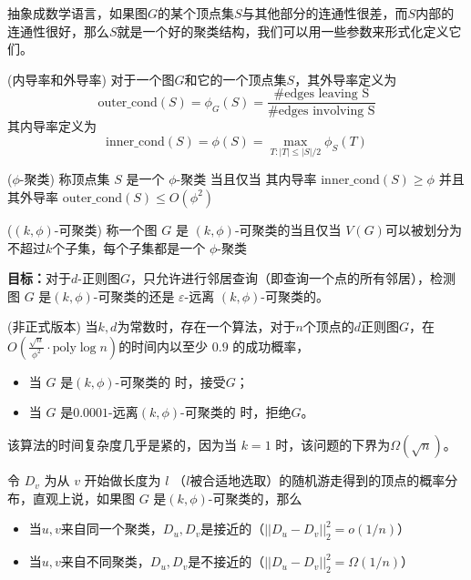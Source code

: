 抽象成数学语言，如果图$G$的某个顶点集$S$与其他部分的连通性很差，而$S$内部的连通性很好，那么$S$就是一个好的聚类结构，我们可以用一些参数来形式化定义它们。

\begin{definition}{(内导率和外导率)}
    对于一个图$G$和它的一个顶点集$S$，其外导率定义为
    \[
    \mathrm{outer\_cond}(S)=\phi_G(S)=\frac{\# \text{edges leaving S}}{\# \text{edges involving S}}
    \]
    其内导率定义为
    \[
    \mathrm{inner\_cond}(S)=\phi(S)=\max_{T:|T|\leq |S|/2} \phi_S(T)
    \]
\end{definition}

\begin{definition}{($\phi$-聚类)}
    称顶点集 $S$ 是一个 $\phi$-聚类 当且仅当 其内导率 $\mathrm{inner\_cond}(S)\geq \phi$ 并且 其外导率 $\mathrm{outer\_cond}(S)\leq O(\phi^2)$
\end{definition}

\begin{definition}{($(k,\phi)$-可聚类)}
    称一个图 $G$ 是 $(k,\phi)$-可聚类的当且仅当 $V(G)$可以被划分为不超过$k$个子集，每个子集都是一个 $\phi$-聚类
\end{definition}

\textbf{目标：}对于$d$-正则图$G$，只允许进行邻居查询（即查询一个点的所有邻居），检测图 $G$ 是$(k,\phi)$-可聚类的还是 $\varepsilon$-远离 $(k,\phi)$-可聚类的。

\begin{theorem}{(非正式版本)}
    当$k,d$为常数时，存在一个算法，对于$n$个顶点的$d$正则图$G$，在$O(\frac{\sqrt{n}}{\phi^2}\cdot\mathrm{poly}\log n)$的时间内以至少 $0.9$ 的成功概率，
    \begin{itemize}
        \item 当 $G$ 是$(k,\phi)$-可聚类的 时，接受$G$；
        \item 当 $G$ 是$0.0001$-远离$(k,\phi)$-可聚类的 时，拒绝$G$。
    \end{itemize}
\end{theorem}

该算法的时间复杂度几乎是紧的，因为当 $k=1$ 时，该问题的下界为$\Omega(\sqrt{n})$。

令 $D_v$ 为从 $v$ 开始做长度为 $l$ （$l$被合适地选取）的随机游走得到的顶点的概率分布，直观上说，如果图 $G$ 是$(k,\phi)$-可聚类的，那么
\begin{itemize}
    \item 当$u,v$来自同一个聚类，$D_u,D_v$是接近的（$||D_u-D_v||_2^2=o(1/n)$）
    \item 当$u,v$来自不同聚类，$D_u,D_v$是不接近的（$||D_u-D_v||_2^2=\Omega(1/n)$）
\end{itemize}

